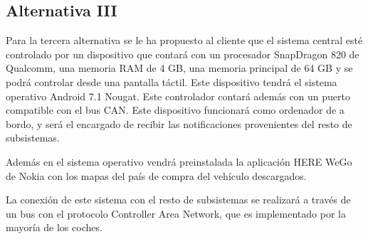 \subsection{Alternativa III}

\par Para la tercera alternativa se le ha propuesto al cliente que el sistema central esté controlado por un dispositivo que contará con un procesador SnapDragon 820 de Qualcomm, una memoria RAM de 4 GB, una memoria principal de 64 GB y se podrá controlar desde una pantalla táctil. Este dispositivo tendrá el sistema operativo Android 7.1 Nougat. Este controlador contará además con un puerto compatible con el bus CAN. Este dispositivo funcionará como ordenador de a bordo, y será el encargado de recibir las notificaciones provenientes del resto de subsistemas.


Además en el sistema operativo vendrá preinstalada la aplicación HERE WeGo de Nokia con los mapas del país de compra del vehículo descargados.

La conexión de este sistema con el resto de subsistemas se realizará a través de un bus con el protocolo Controller Area Network, que es implementado por la mayoría de los coches.


